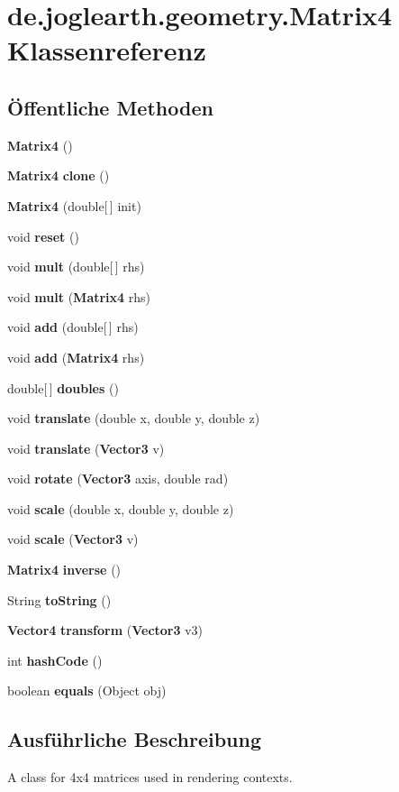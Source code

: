 \section{de.\-joglearth.\-geometry.\-Matrix4 Klassenreferenz}
\label{classde_1_1joglearth_1_1geometry_1_1_matrix4}
\subsection*{Öffentliche Methoden}
\begin{DoxyCompactItemize}
\item 
{\bf Matrix4} ()
\item 
{\bf Matrix4} {\bf clone} ()
\item 
{\bf Matrix4} (double[$\,$] init)
\item 
void {\bf reset} ()
\item 
void {\bf mult} (double[$\,$] rhs)
\item 
void {\bf mult} ({\bf Matrix4} rhs)
\item 
void {\bf add} (double[$\,$] rhs)
\item 
void {\bf add} ({\bf Matrix4} rhs)
\item 
double[$\,$] {\bf doubles} ()
\item 
void {\bf translate} (double x, double y, double z)
\item 
void {\bf translate} ({\bf Vector3} v)
\item 
void {\bf rotate} ({\bf Vector3} axis, double rad)
\item 
void {\bf scale} (double x, double y, double z)
\item 
void {\bf scale} ({\bf Vector3} v)
\item 
{\bf Matrix4} {\bf inverse} ()
\item 
String {\bf to\-String} ()
\item 
{\bf Vector4} {\bf transform} ({\bf Vector3} v3)
\item 
int {\bfseries hash\-Code} ()\label{classde_1_1joglearth_1_1geometry_1_1_matrix4_a7299aaf8de4c8734194fe0573c5976d2}

\item 
boolean {\bfseries equals} (Object obj)\label{classde_1_1joglearth_1_1geometry_1_1_matrix4_a607b1abe61ca18c63b9a794fb95f1207}

\end{DoxyCompactItemize}


\subsection{Ausführliche Beschreibung}
A class for 4x4 matrices used in rendering contexts.

